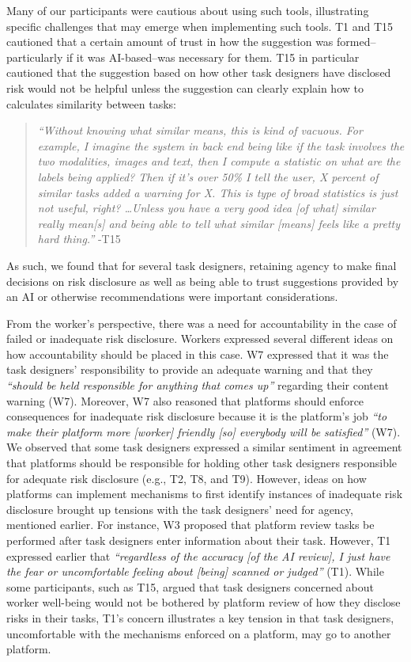 Many of our participants were cautious about using such tools, illustrating specific challenges that may emerge when implementing such tools. T1 and T15 cautioned that a certain amount of trust in how the suggestion was formed--particularly if it was AI-based--was necessary for them. T15 in particular cautioned that the suggestion based on how other task designers have disclosed risk would not be helpful unless the suggestion can clearly explain how to calculates similarity between tasks: 
\begin{quote}
    \textit{``Without knowing what similar means, this is kind of vacuous. For example, I imagine the system in back end being like if the task involves the two modalities, images and text, then I compute a statistic on what are the labels being applied? Then if it's over 50\% I tell the user, X percent of similar tasks added a warning for X. This is type of broad statistics is just not useful, right? \dots Unless you have a very good idea [of what] similar really mean[s] and being able to tell what similar [means] feels like a pretty hard thing.''} -T15
\end{quote}
As such, we found that for several task designers, retaining agency to make final decisions on risk disclosure as well as being able to trust suggestions provided by an AI or otherwise recommendations were important considerations. 

From the worker's perspective, there was a need for accountability in the case of failed or inadequate risk disclosure. Workers expressed several different ideas on how accountability should be placed in this case. W7 expressed that it was the task designers' responsibility to provide an adequate warning and that they \textit{``should be held responsible for anything that comes up''} regarding their content warning (W7). Moreover, W7 also reasoned that platforms should enforce consequences for inadequate risk disclosure because it is the platform's job \textit{``to make their platform more [worker] friendly [so] everybody will be satisfied''} (W7). We observed that some task designers expressed a similar sentiment in agreement that platforms should be responsible for holding other task designers responsible for adequate risk disclosure (e.g., T2, T8, and T9). However, ideas on how platforms can implement mechanisms to first identify instances of inadequate risk disclosure brought up tensions with the task designers' need for agency, mentioned earlier. For instance, W3 proposed that platform review tasks be performed after task designers enter information about their task. However, T1 expressed earlier that \textit{``regardless of the accuracy [of the AI review], I just have the fear or uncomfortable feeling about [being] scanned or judged''} (T1). While some participants, such as T15, argued that task designers concerned about worker well-being would not be bothered by platform review of how they disclose risks in their tasks, T1's concern illustrates a key tension in that task designers, uncomfortable with the mechanisms enforced on a platform, may go to another platform. 

